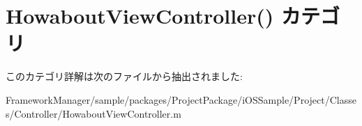 \hypertarget{category_howabout_view_controller_07_08}{}\section{Howabout\+View\+Controller() カテゴリ}
\label{category_howabout_view_controller_07_08}


このカテゴリ詳解は次のファイルから抽出されました\+:\begin{DoxyCompactItemize}
\item 
Framework\+Manager/sample/packages/\+Project\+Package/i\+O\+S\+Sample/\+Project/\+Classes/\+Controller/Howabout\+View\+Controller.\+m\end{DoxyCompactItemize}
